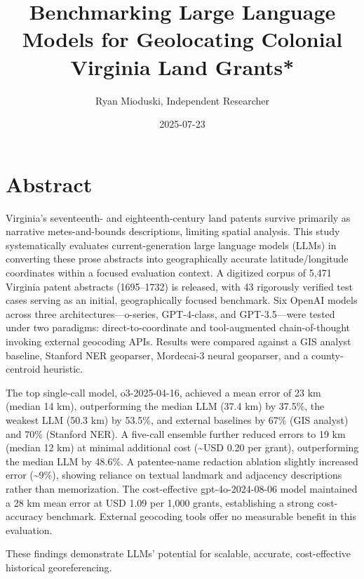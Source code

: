 \documentclass[
  10pt,
  twocolumn]{article}
\title{Benchmarking Large Language Models for Geolocating Colonial
Virginia Land Grants*}
\author{Ryan Mioduski, Independent Researcher}
\date{2025-07-23}
\begin{document}
\maketitle

\vspace{1em}

\section{Abstract}\label{abstract}

Virginia's seventeenth- and eighteenth-century land patents survive
primarily as narrative metes-and-bounds descriptions, limiting spatial
analysis. This study systematically evaluates current-generation large
language models (LLMs) in converting these prose abstracts into
geographically accurate latitude/longitude coordinates within a focused
evaluation context. A digitized corpus of 5,471 Virginia patent
abstracts (1695--1732) is released, with 43 rigorously verified test
cases serving as an initial, geographically focused benchmark. Six
OpenAI models across three architectures---o-series, GPT-4-class, and
GPT-3.5---were tested under two paradigms: direct-to-coordinate and
tool-augmented chain-of-thought invoking external geocoding APIs.
Results were compared against a GIS analyst baseline, Stanford NER
geoparser, Mordecai-3 neural geoparser, and a county-centroid heuristic.

The top single-call model, o3-2025-04-16, achieved a mean error of 23 km
(median 14 km), outperforming the median LLM (37.4 km) by 37.5\%, the
weakest LLM (50.3 km) by 53.5\%, and external baselines by 67\% (GIS
analyst) and 70\% (Stanford NER). A five-call ensemble further reduced
errors to 19 km (median 12 km) at minimal additional cost
(\textasciitilde USD 0.20 per grant), outperforming the median LLM by
48.6\%. A patentee-name redaction ablation slightly increased error
(\textasciitilde9\%), showing reliance on textual landmark and adjacency
descriptions rather than memorization. The cost-effective
gpt-4o-2024-08-06 model maintained a 28 km mean error at USD 1.09 per
1,000 grants, establishing a strong cost-accuracy benchmark. External
geocoding tools offer no measurable benefit in this evaluation.

These findings demonstrate LLMs' potential for scalable, accurate,
cost-effective historical georeferencing.

\renewcommand{\thefootnote}{\fnsymbol{footnote}}
\end{document}
